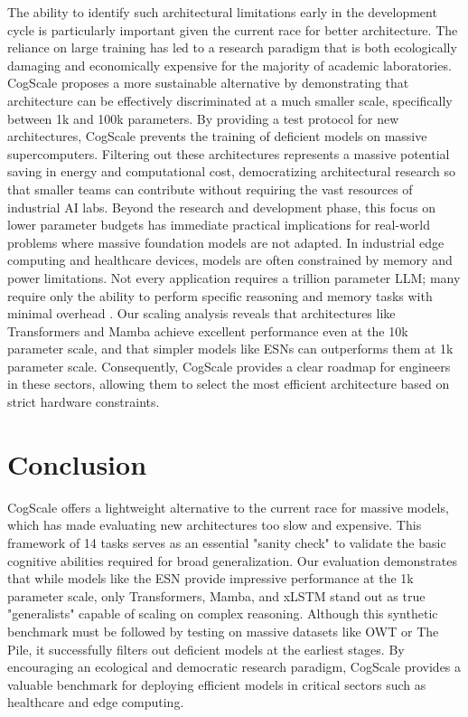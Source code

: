 \documentclass{article}
\begin{document}
The ability to identify such architectural limitations early in the development cycle is particularly important given the current race for better architecture. The reliance on large training \cite{kaplan2020scaling, hoffmann2022training} has led to a research paradigm that is both ecologically damaging \cite{bender2021dangers} and economically expensive for the majority of academic laboratories. CogScale proposes a more sustainable alternative by demonstrating that architecture can be effectively discriminated at a much smaller scale, specifically between 1k and 100k parameters. By providing a test protocol for new architectures, CogScale prevents the training of deficient models on massive supercomputers. Filtering out these architectures represents a massive potential saving in energy and computational cost, democratizing architectural research so that smaller teams can contribute without requiring the vast resources of industrial AI labs. 
Beyond the research and development phase, this focus on lower parameter budgets has immediate practical implications for real-world problems where massive foundation models are not adapted. In industrial edge computing and healthcare devices, models are often constrained by memory and power limitations. Not every application requires a trillion parameter LLM; many require only the ability to perform specific reasoning and memory tasks with minimal overhead \cite{chen2024role}. Our scaling analysis reveals that architectures like Transformers and Mamba achieve excellent performance even at the 10k parameter scale, and that simpler models like ESNs can outperforms them at 1k parameter scale. Consequently, CogScale provides a clear roadmap for engineers in these sectors, allowing them to select the most efficient architecture based on strict hardware constraints.

\section{Conclusion}

CogScale offers a lightweight alternative to the current race for massive models, which has made evaluating new architectures too slow and expensive. This framework of 14 tasks serves as an essential "sanity check" to validate the basic cognitive abilities required for broad generalization. Our evaluation demonstrates that while models like the ESN provide impressive performance at the 1k parameter scale, only Transformers, Mamba, and xLSTM stand out as true "generalists" capable of scaling on complex reasoning. Although this synthetic benchmark must be followed by testing on massive datasets like OWT or The Pile, it successfully filters out deficient models at the earliest stages. By encouraging an ecological and democratic research paradigm, CogScale provides a valuable benchmark for deploying efficient models in critical sectors such as healthcare and edge computing.
\end{document}
